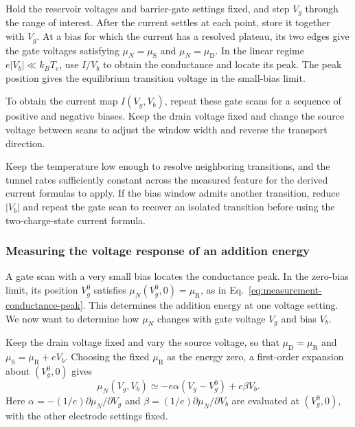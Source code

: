 Hold the reservoir voltages and barrier-gate settings fixed, and
step $V_g$ through the range of interest. After the current settles
at each point, store it together with $V_g$. At a bias for which
the current has a resolved plateau, its two edges give the gate
voltages satisfying $\mu_N=\mu_{\mathrm S}$ and
$\mu_N=\mu_{\mathrm D}$. In the linear regime
$e|V_b|\ll k_BT_e$, use $I/V_b$ to obtain the conductance and locate
its peak. The peak position gives the equilibrium transition
voltage in the small-bias limit.

To obtain the current map $I(V_g,V_b)$, repeat these gate scans
for a sequence of positive and negative biases. Keep the drain
voltage fixed and change the source voltage between scans to
adjust the window width and reverse the transport direction.

Keep the temperature low enough to resolve neighboring transitions,
and the tunnel rates sufficiently constant across the measured
feature for the derived current formulas to apply.
If the bias window admits another transition, reduce $|V_b|$ and
repeat the gate scan to recover an isolated transition before using
the two-charge-state current formula.

\subsubsection{Measuring the voltage response of an addition energy}
\label{sec:measurement-bias-spectroscopy}

A gate scan with a very small bias locates the conductance peak.
In the zero-bias limit, its position $V_g^0$ satisfies
$\mu_N(V_g^0,0)=\mu_{\mathrm R}$, as in
Eq.~\eqref{eq:measurement-conductance-peak}. This determines the
addition energy at one voltage setting. We now want to determine
how $\mu_N$ changes with gate voltage $V_g$ and bias $V_b$.

Keep the drain voltage fixed and vary the source voltage, so that
$\mu_{\mathrm D}=\mu_{\mathrm R}$ and
$\mu_{\mathrm S}=\mu_{\mathrm R}+eV_b$. Choosing the fixed
$\mu_{\mathrm R}$ as the energy zero, a first-order expansion
about $(V_g^0,0)$ gives
\begin{equation}
 \mu_N(V_g,V_b)\simeq-e\alpha(V_g-V_g^0)+e\beta V_b.
 \label{eq:measurement-biased-level}
\end{equation}
Here $\alpha=-(1/e)\partial\mu_N/\partial V_g$ and
$\beta=(1/e)\partial\mu_N/\partial V_b$ are evaluated at
$(V_g^0,0)$, with the other electrode settings fixed.

